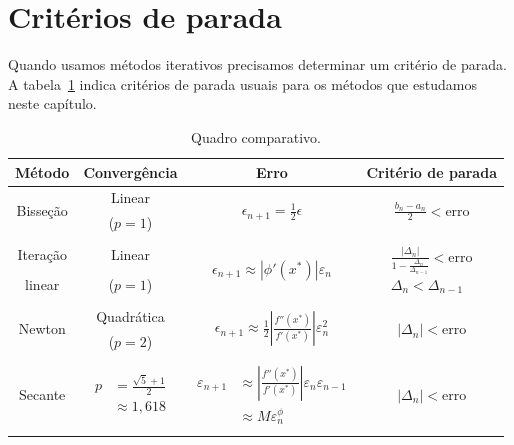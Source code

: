 \section{Critérios de parada}

Quando usamos métodos iterativos precisamos determinar um critério de parada. A tabela~\ref{tab:quadro_comparativo} indica critérios de parada usuais para os métodos que estudamos neste capítulo.

\begin{table}[h!]
  \centering
  \caption{Quadro comparativo.}
  \label{tab:quadro_comparativo}
  {\small
  \begin{tabular}[h!]{cccc} \hline
    Método & Convergência & Erro & Critério de parada \\ \hline
    \multirow{2}{*}{Bisseção} & Linear & \multirow{2}{*}{$\displaystyle \epsilon_{n+1}=\frac{1}{2}\epsilon$} & \multirow{2}{*}{$\displaystyle \frac{b_n - a_n}{2} < \text{erro}$} \\
    & ($p=1$) & & \\
    & & & \\
    Iteração & Linear & \multirow{2}{*}{$\displaystyle \epsilon_{n+1}\approx |\phi'(x^*)| \varepsilon_{n}$} & \multirow{2}{*}{$\displaystyle \begin{array}{cc} \frac{|\Delta_n|}{1-\frac{\Delta_n}{\Delta_{n-1}}}< \text{erro} \\ \Delta_{n} < \Delta_{n-1}\end{array}$} \\
    linear                 & ($p=1$) & & \\
    & & & \\
    \multirow{2}{*}{Newton} & Quadrática & \multirow{2}{*}{$\displaystyle \epsilon_{n+1}\approx \frac{1}{2}\left|\frac{f''(x^*)}{f'(x^*)}\right|\varepsilon_{n}^2$} & \multirow{2}{*}{$|\Delta_n|< \text{erro}$} \\
    & ($p=2$) & & \\
    & & & \\
    \multirow{3}{*}{Secante} & \multirow{3}{*}{$\displaystyle \begin{array}{rl} p &= {\displaystyle \frac{\sqrt{5}+1}{2}}\\
  &\approx 1,618\end{array}$} & \multirow{3}{*}{$\displaystyle \begin{array}{rl} \varepsilon_{n+1} &\approx \displaystyle \left|\frac{f''(x^*)}{f'(x^*)}\right| \varepsilon_{n}\varepsilon_{n-1} \\
    &\approx M \varepsilon_{n}^\phi\end{array}$} & \multirow{3}{*}{$|\Delta_n|< \text{erro}$}\\
    & & & \\
    & & & \\
    & & & \\ \hline
  \end{tabular}
}
\end{table}



